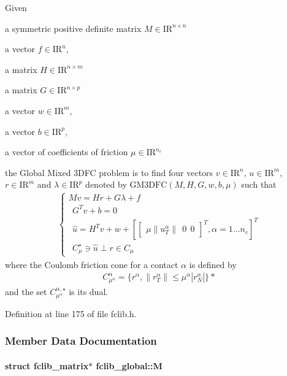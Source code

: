 Given 
\begin{DoxyItemize}
\item a symmetric positive definite matrix ${M} \in {\mathrm{I\!R}}^{n \times n}$ 
\item a vector $ {f} \in {\mathrm{I\!R}}^n$, 
\item a matrix ${H} \in {\mathrm{I\!R}}^{n \times m}$ 
\item a matrix ${G} \in {\mathrm{I\!R}}^{n \times p}$ 
\item a vector $w \in {\mathrm{I\!R}}^{m}$, 
\item a vector $b \in {\mathrm{I\!R}}^{p}$, 
\item a vector of coefficients of friction $\mu \in {\mathrm{I\!R}}^{n_c}$ 
\end{DoxyItemize}the Global Mixed 3\+D\+F\+C problem is to find four vectors $ {v} \in {\mathrm{I\!R}}^n$, $u\in{\mathrm{I\!R}}^m$, $r\in {\mathrm{I\!R}}^m$ and $\lambda \in {\mathrm{I\!R}}^p$ denoted by $\mathrm{GM3DFC}(M,H,G,w,b,\mu)$ such that \begin{eqnarray*} \begin{cases} M v = {H} {r} + G\lambda + {f} \\ \ \ G^T v +b =0 \\ \ \ \hat u = H^T v + w +\left[ \left[\begin{array}{c} \mu \|u^\alpha_T\|\ \ 0 \ \ 0 \end{array}\right]^T, \alpha = 1 \ldots n_c \right]^T \\ \ \ C^\star_{\mu} \ni {\hat u} \perp r \in C_{\mu} \end{cases} \end{eqnarray*} where the Coulomb friction cone for a contact $\alpha$ is defined by \begin{eqnarray*} \label{eq:CCC} C_{\mu^\alpha}^{\alpha} = \{r^\alpha, \|r^\alpha_T \| \leq \mu^\alpha |r^\alpha_N| \} *\end{eqnarray*} and the set $C^{\alpha,\star}_{\mu^\alpha}$ is its dual. 

Definition at line 175 of file fclib.\+h.



\subsubsection{Member Data Documentation}
\hypertarget{structfclib__global_a82538cefd07d0f1f6c1e7baebe768fc6}{}
\paragraph[{M}]{\setlength{\rightskip}{0pt plus 5cm}struct {\bf fclib\+\_\+matrix}$\ast$ fclib\+\_\+global\+::\+M}\label{structfclib__global_a82538cefd07d0f1f6c1e7baebe768fc6}


